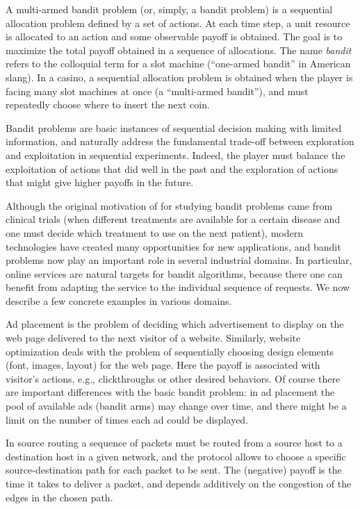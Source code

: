A multi-armed bandit problem (or, simply, a bandit problem) is a sequential allocation problem defined by a set of actions. At each time step, a unit resource is allocated to an action and some observable payoff is obtained. The goal is to maximize the total payoff obtained in a sequence of allocations. The name \textsl{bandit} refers to the colloquial term for a slot machine (``one-armed bandit'' in American slang). In a casino, a sequential allocation problem is obtained when the player is facing many slot machines at once (a ``multi-armed bandit''), and must repeatedly choose where to insert the next coin.

Bandit problems are basic instances of sequential decision making with limited information, and naturally address the fundamental trade-off between exploration and exploitation in sequential experiments. Indeed, the player must balance the exploitation of actions that did well in the past and the exploration of actions that might give higher payoffs in the future.

Although the original motivation of \cite{Tho33} for studying bandit problems came from clinical trials (when different treatments are available for a certain disease and one must decide which treatment to use on the next patient), modern technologies have created many opportunities for new applications, and bandit problems now play an important role in several industrial domains. In particular, online services are natural targets for bandit algorithms, because there one can benefit from adapting the service to the individual sequence of requests. We now describe a few concrete examples in various domains.

Ad placement is the problem of deciding which advertisement to display on the web page delivered to the next visitor of a website. Similarly, website optimization deals with the problem of sequentially choosing design elements (font, images, layout) for the web page. Here the payoff is associated with visitor's actions, e.g., clickthroughs or other desired behaviors. Of course there are important differences with the basic bandit problem: in ad placement the pool of available ads (bandit arms) may change over time, and there might be a limit on the number of times each ad could be displayed.

In source routing a sequence of packets must be routed from a source host to a destination host in a given network, and the protocol allows to choose a specific source-destination path for each packet to be sent. The (negative) payoff is the time it takes to deliver a packet, and depends additively on the congestion of the edges in the chosen path.

